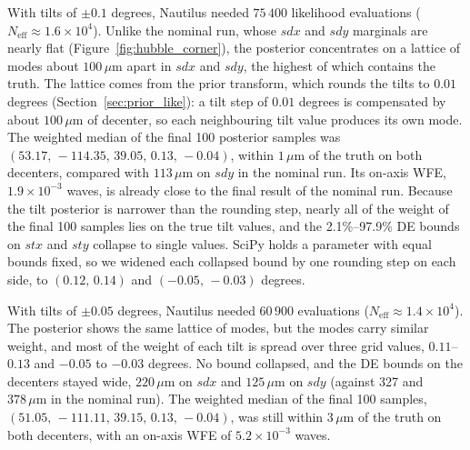 With tilts of $\pm0.1$ degrees, Nautilus needed $75\,400$ likelihood evaluations ($N_{\mathrm{eff}}\approx1.6\times10^4$). Unlike the nominal run, whose $sdx$ and $sdy$ marginals are nearly flat (Figure~\ref{fig:hubble_corner}), the posterior concentrates on a lattice of modes about $100\,\mu\mathrm{m}$ apart in $sdx$ and $sdy$, the highest of which contains the truth. The lattice comes from the prior transform, which rounds the tilts to $0.01$ degrees (Section~\ref{sec:prior_like}): a tilt step of $0.01$ degrees is compensated by about $100\,\mu\mathrm{m}$ of decenter, so each neighbouring tilt value produces its own mode. The weighted median of the final 100 posterior samples was $(53.17,\allowbreak\,-114.35,\allowbreak\,39.05,\allowbreak\,0.13,\allowbreak\,-0.04)$, within $1\,\mu\mathrm{m}$ of the truth on both decenters, compared with $113\,\mu\mathrm{m}$ on $sdy$ in the nominal run. Its on-axis WFE, $1.9\times10^{-3}$ waves, is already close to the final result of the nominal run. Because the tilt posterior is narrower than the rounding step, nearly all of the weight of the final 100 samples lies on the true tilt values, and the 2.1\%--97.9\% DE bounds on $stx$ and $sty$ collapse to single values. SciPy holds a parameter with equal bounds fixed, so we widened each collapsed bound by one rounding step on each side, to $(0.12,\,0.14)$ and $(-0.05,\,-0.03)$ degrees.

With tilts of $\pm0.05$ degrees, Nautilus needed $60\,900$ evaluations ($N_{\mathrm{eff}}\approx1.4\times10^4$). The posterior shows the same lattice of modes, but the modes carry similar weight, and most of the weight of each tilt is spread over three grid values, $0.11$--$0.13$ and $-0.05$ to $-0.03$ degrees. No bound collapsed, and the DE bounds on the decenters stayed wide, $220\,\mu\mathrm{m}$ on $sdx$ and $125\,\mu\mathrm{m}$ on $sdy$ (against 327 and $378\,\mu\mathrm{m}$ in the nominal run). The weighted median of the final 100 samples, $(51.05,\allowbreak\,-111.11,\allowbreak\,39.15,\allowbreak\,0.13,\allowbreak\,-0.04)$, was still within $3\,\mu\mathrm{m}$ of the truth on both decenters, with an on-axis WFE of $5.2\times10^{-3}$ waves.

